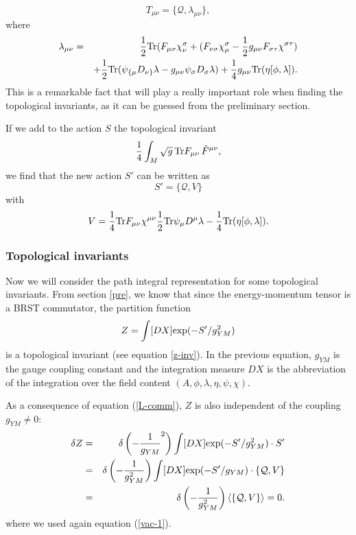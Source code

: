 \documentclass[12pt, onecolumn]{article}
\begin{document}
\begin{equation}
T_{\mu \nu} = \{\mathcal{Q},\lambda_{\mu \nu}\},
\end{equation}
 where
\begin{eqnarray}
\lambda_{\mu \nu} &=& \frac{1}{2}{\rm Tr}(F_{\mu \sigma}\chi_{\nu}^\sigma+(F_{\nu \sigma}\chi_{\mu}^\sigma-\frac{1}{2}g_{\mu \nu}F_{\sigma\tau}\chi^{\sigma\tau}) \nonumber \\
&&+\frac{1}{2}{\rm Tr}(\psi_{\{\mu} D_{\nu\}} \lambda -g_{\mu \nu}\psi_{\sigma} D_{\sigma}\lambda)+\frac{1}{4}g_{\mu \nu}{\rm Tr}(\eta[\phi,\lambda]). 
\end{eqnarray} This is a remarkable fact that will play a really important role when finding the topological invariants, as it can be guessed from the preliminary section.

If we add to the action $S$ the topological invariant $$\frac{1}{4}\int_M\sqrt{g}\,{\rm Tr}F_{\mu\nu}\,\tilde{F}^{\mu \nu},$$ we find that the new action $S'$ can be written as 
\begin{equation}
S'=\{\mathcal{Q},V\} \label{L-comm}
\end{equation} with 
\begin{equation}
 V=\frac{1}{4}{\rm Tr}F_{\mu\nu}\chi^{\mu \nu}\frac{1}{2}{\rm Tr}\psi_\mu D^\mu \lambda-\frac{1}{4}{\rm Tr}(\eta[\phi,\lambda]).
\end{equation} 
 
\subsubsection{Topological invariants}
 
Now we will consider the path integral representation for some topological invariants. From section \ref{pre}, we know that since the energy-momentum tensor is a BRST commutator, the partition function 
\begin{equation}
Z=\int [DX] {\rm exp}(-S'/g_{YM}^2) 
\end{equation} is a topological invariant (see equation \ref{z-inv}). In the previous equation, $g_{YM}$ is the gauge coupling constant and the integration measure $DX$ is the abbreviation of the integration over the field content $(A, \phi, \lambda,\eta,\psi,\chi)$. 

As a consequence of equation (\ref{L-comm}), $Z$ is also independent of the coupling $g_{YM} \neq 0$:
\begin{eqnarray}
\delta Z&=& \delta\left( -\frac{1}{g_{YM}}^2\right) \int [DX] {\rm exp} (-S'/g_{YM}^2)\cdot S' \nonumber \\
&=& \delta\left( -\frac{1}{g_{YM}^2}\right) \int [DX] {\rm exp} (-S'/g_{YM})\cdot \{\mathcal{Q},V\} \nonumber \\ &=& \delta\left( -\frac{1}{g_{YM}^2}\right)\langle \{\mathcal{Q},V\} \rangle = 0.
\end{eqnarray} where we used again equation (\ref{vac-1}).
\end{document}
